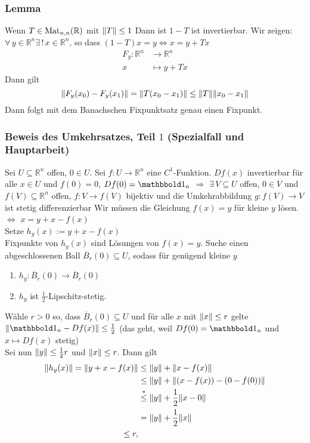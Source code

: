 \subsubsection{Lemma} %
\label{ssub:lemma}
Wenn $T \in \operatorname{Mat}_{n,n}(\mathbb{R})$ mit $\norm{T}\leq 1$ Dann ist $1-T$ ist invertierbar.
Wir zeigen: $\forall\, y \in \mathbb{R}^n \exists\,! \,x \in \mathbb{R}^n$, so dass $(1-T)x=y \Leftrightarrow  x=y+Tx$ \\
\begin{align*}
	F_y: \mathbb{R}^n &\to \mathbb{R}^n \\
	x &\mapsto y+Tx 
\end{align*}
Dann gilt
\[
	\norm{F_y(x_0)-F_y(x_1)} = \norm{T(x_0-x_1)} \leq \norm{T} \norm{x_0-x_1}
\]
Dann folgt mit dem Banachschen Fixpunktsatz genau einen Fixpunkt. \bewende
\subsubsection{Beweis des Umkehrsatzes, Teil $1$ (Spezialfall und Hauptarbeit)} %
\label{ssub:beweis_des_umkehrsatzes_teil_1_spezialfall_und_hauptarbeit}
Sei $ U \subseteq \mathbb{R}^n$ offen, $0 \in U$. Sei $f: U \to \mathbb{R}^n$ eine $C^1$-Funktion. $Df(x)$ invertierbar für alle $x \in U$ und $f(0)=0$, $Df(0)=\ind_n$
$\Rightarrow $ $\exists\, V \subseteq U$ offen, $0 \in V$ und $f(V) \subseteq \mathbb{R}^n$ offen, $f:V \to f(V)$ bijektiv und die Umkehrabbildung $g: f(V) \to V$ ist stetig differenzierbar
 Wir müssen die Gleichung $f(x)=y$ für kleine $y$ lösen.
$\Leftrightarrow$ $x = y + x - f(x)$ \\
Setze $h_y(x):= y + x - f(x)$ \\
Fixpunkte von $h_y(x)$ sind Lösungen von $f(x)=y$. Suche einen abgeschlossenen Ball $\overline{B}_r(0) \subseteq U$, sodass für genügend kleine $y$
\begin{enumerate}
	\item $h_y: \overline{B}_r(0) \to \overline{B}_r(0)$
	\item $h_y$ ist $\frac{1}{2}$-Lipschitz-stetig.
\end{enumerate}
Wähle $r>0$ so, dass $\overline{B}_r(0) \subseteq U$ und für alle $x$ mit $\norm{x}\leq r$ gelte $\norm{\ind_n - Df(x)} \leq \frac{1}{2}$
(das geht, weil $Df(0)=\ind_n$ und $x \mapsto Df(x)$ stetig) \\
Sei nun $\norm{y} \leq \frac{1}{2}r$ und $\norm{x} \leq r$. Dann gilt
\begin{align*}
	\norm{h_y(x)} = \norm{y + x - f(x)} &\leq \norm{y} + \norm{x-f(x)} \\
	&\leq \norm{y}+ \norm{(x-f(x))-(0-f(0))} \\
	&\stackrel{*}{\leq} \norm{y} + \frac{1}{2} \norm{x-0} \\
	&= \norm{y}+ \frac{1}{2} \norm{x} \\
	\leq r,
\end{align*}
